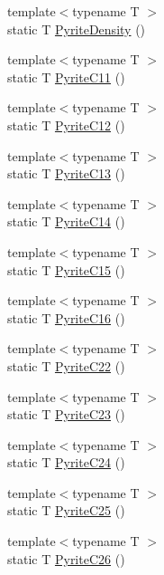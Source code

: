 \begin{DoxyCompactItemize}
\item 
{\footnotesize template$<$typename T $>$ }\\static T \mbox{\hyperlink{namespacempc_1_1data_aa084718e0e088b08ef4446f166f2baf3}{Pyrite\+Density}} ()
\item 
{\footnotesize template$<$typename T $>$ }\\static T \mbox{\hyperlink{namespacempc_1_1data_a00d8283e3281c5ba81e78ffc8421ad96}{Pyrite\+C11}} ()
\item 
{\footnotesize template$<$typename T $>$ }\\static T \mbox{\hyperlink{namespacempc_1_1data_aade0b397c9aac7f443182fa1fcf7a081}{Pyrite\+C12}} ()
\item 
{\footnotesize template$<$typename T $>$ }\\static T \mbox{\hyperlink{namespacempc_1_1data_add506a3d279a43e1163ae3dbb77a40f4}{Pyrite\+C13}} ()
\item 
{\footnotesize template$<$typename T $>$ }\\static T \mbox{\hyperlink{namespacempc_1_1data_ae1f4efdc925b130db38870089452d37e}{Pyrite\+C14}} ()
\item 
{\footnotesize template$<$typename T $>$ }\\static T \mbox{\hyperlink{namespacempc_1_1data_aaa65841ee18aacf1f2129550c8477a98}{Pyrite\+C15}} ()
\item 
{\footnotesize template$<$typename T $>$ }\\static T \mbox{\hyperlink{namespacempc_1_1data_aadc7907a02ccd1335349064d3513770d}{Pyrite\+C16}} ()
\item 
{\footnotesize template$<$typename T $>$ }\\static T \mbox{\hyperlink{namespacempc_1_1data_aafae2f7b8f2d79d9b2c0a5bc7d8cd87c}{Pyrite\+C22}} ()
\item 
{\footnotesize template$<$typename T $>$ }\\static T \mbox{\hyperlink{namespacempc_1_1data_a5c043aece5b6ab9fc5d8417c0e4a93e1}{Pyrite\+C23}} ()
\item 
{\footnotesize template$<$typename T $>$ }\\static T \mbox{\hyperlink{namespacempc_1_1data_a3413d3add21dc22a49654e9b6cbd8870}{Pyrite\+C24}} ()
\item 
{\footnotesize template$<$typename T $>$ }\\static T \mbox{\hyperlink{namespacempc_1_1data_a4e7e453486c3864d96595a971392322b}{Pyrite\+C25}} ()
\item 
{\footnotesize template$<$typename T $>$ }\\static T \mbox{\hyperlink{namespacempc_1_1data_a1adf08e668a71a8153265894bc694d2a}{Pyrite\+C26}} ()

\end{DoxyCompactItemize}
